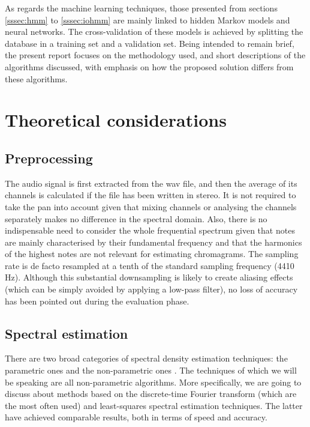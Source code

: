 \documentclass[letterpaper]{article}
\begin{document}
As regards the machine learning techniques, those presented from sections \ref{sssec:hmm} to \ref{sssec:iohmm}
are mainly linked to hidden Markov models and neural networks. The cross-validation of these models is achieved by splitting
the database in a training set and a validation set. Being intended to remain brief, the present report focuses on the methodology used,
and short descriptions of the algorithms discussed, with emphasis on how the proposed solution differs from these algorithms.

\section{Theoretical considerations}

\subsection{Preprocessing}

The audio signal is first extracted from the wav file, and then the average of its channels is calculated
if the file has been written in stereo. It is not required to take the pan into account given that mixing
channels or analysing the channels separately makes no difference in the spectral domain. Also, there is
no indispensable need to consider the whole frequential spectrum given that notes are mainly characterised 
by their fundamental frequency
and that the harmonics of the highest notes are not relevant for estimating chromagrams.
The sampling rate is de facto resampled at a tenth of the standard sampling frequency (4410 Hz).
Although this substantial downsampling is likely to create aliasing effects (which can be simply avoided by 
applying a low-pass filter), no loss of accuracy has been pointed out during the evaluation phase.

\subsection{Spectral estimation}

There are two broad categories of spectral density estimation techniques: the parametric ones and the non-parametric ones \citep{MHH}. The techniques
of which we will be speaking are all non-parametric algorithms. More specifically, we are going to discuss about methods based on the discrete-time Fourier transform (which are the most often used) and least-squares spectral estimation techniques. The latter have achieved comparable results, both in terms of speed and accuracy.
\end{document}

